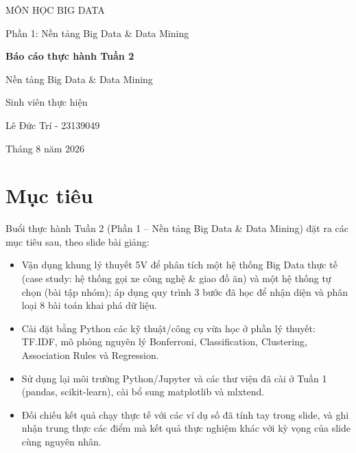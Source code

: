\documentclass[12pt,a4paper,oneside]{article}
\begin{document}
\begin{titlepage}
\centering
{\large MÔN HỌC BIG DATA\par}
\vspace{0.4cm}
{\large Phần 1: Nền tảng Big Data \& Data Mining\par}
\vspace{3cm}
{\LARGE\bfseries Báo cáo thực hành Tuần 2\par}
\vspace{0.6cm}
{\Large Nền tảng Big Data \& Data Mining\par}
\vspace{3cm}
{\large Sinh viên thực hiện\par}
{\large Lê Đức Trí - 23139049 \par}
\vfill
{\large Tháng 8 năm 2026\par}
\end{titlepage}

\tableofcontents
\newpage

\section{Mục tiêu}

Buổi thực hành Tuần 2 (Phần 1 -- Nền tảng Big Data \& Data Mining) đặt ra các mục tiêu sau, theo slide bài giảng:

\begin{itemize}
  \item Vận dụng khung lý thuyết 5V để phân tích một hệ thống Big Data thực tế (case study: hệ thống gọi xe công nghệ \& giao đồ ăn) và một hệ thống tự chọn (bài tập nhóm); áp dụng quy trình 3 bước đã học để nhận diện và phân loại 8 bài toán khai phá dữ liệu.
  \item Cài đặt bằng Python các kỹ thuật/công cụ vừa học ở phần lý thuyết: TF.IDF, mô phỏng nguyên lý Bonferroni, Classification, Clustering, Association Rules và Regression.
  \item Sử dụng lại môi trường Python/Jupyter và các thư viện đã cài ở Tuần 1 (pandas, scikit-learn), cài bổ sung matplotlib và mlxtend.
  \item Đối chiếu kết quả chạy thực tế với các ví dụ số đã tính tay trong slide, và ghi nhận trung thực các điểm mà kết quả thực nghiệm khác với kỳ vọng của slide cùng nguyên nhân.
\end{itemize}
\end{document}
